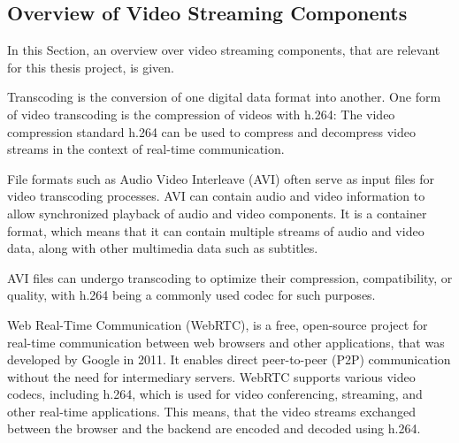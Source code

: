 \documentclass[../MasterThesis.tex]{subfiles}
\begin{document}
\subsection{Overview of Video Streaming Components}
\label{subsection_OverviewVideoStreamingComponents}

In this Section, an overview over video streaming components, that are relevant for this thesis project, is given.

Transcoding is the conversion of one digital data format into another.
One form of video transcoding is the compression of videos with h.264:
The video compression standard h.264 can be used to compress and decompress video streams in the context of real-time communication.~\cite{transcoding, h264}
	

File formats such as Audio Video Interleave (AVI) often serve as input files for video transcoding processes.
AVI can contain audio and video information to allow synchronized playback of audio and video components. 
It is a container format, which means that it can contain multiple streams of audio and video data, along with other multimedia data such as subtitles.~\cite{avi}


AVI files can undergo transcoding to optimize their compression, compatibility, or quality, with h.264 being a commonly used codec for such purposes.~\cite{h264}


Web Real-Time Communication (WebRTC), is a free, open-source project for real-time communication between web browsers and other applications, that was developed by Google in 2011. It enables direct peer-to-peer (P2P) communication without the need for intermediary servers.
WebRTC supports various video codecs, including h.264, which is used for video conferencing, streaming, and other real-time applications. This means, that the video streams exchanged between the browser and the backend are encoded and decoded using h.264.~\cite{webrtc, h264}





\end{document}
